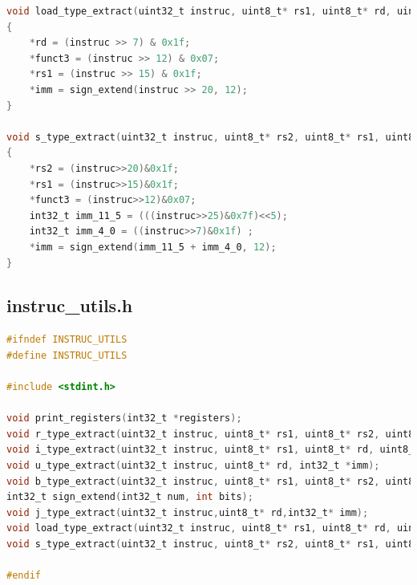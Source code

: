 \begin{lstlisting}[language=C]
void load_type_extract(uint32_t instruc, uint8_t* rs1, uint8_t* rd, uint8_t* funct3, int32_t* imm)
{
    *rd = (instruc >> 7) & 0x1f;
    *funct3 = (instruc >> 12) & 0x07;
    *rs1 = (instruc >> 15) & 0x1f;
    *imm = sign_extend(instruc >> 20, 12);
}

void s_type_extract(uint32_t instruc, uint8_t* rs2, uint8_t* rs1, uint8_t* funct3, int32_t* imm)
{
    *rs2 = (instruc>>20)&0x1f;
    *rs1 = (instruc>>15)&0x1f;
    *funct3 = (instruc>>12)&0x07;
    int32_t imm_11_5 = (((instruc>>25)&0x7f)<<5);
    int32_t imm_4_0 = ((instruc>>7)&0x1f) ;
    *imm = sign_extend(imm_11_5 + imm_4_0, 12);
}

\end{lstlisting}
\subsection{instruc\_utils.h}
\begin{lstlisting}[language=C]
#ifndef INSTRUC_UTILS
#define INSTRUC_UTILS

#include <stdint.h>

void print_registers(int32_t *registers);
void r_type_extract(uint32_t instruc, uint8_t* rs1, uint8_t* rs2, uint8_t* rd, uint8_t* funct7, uint8_t* funct3);
void i_type_extract(uint32_t instruc, uint8_t* rs1, uint8_t* rd, uint8_t* funct3, int32_t *imm);
void u_type_extract(uint32_t instruc, uint8_t* rd, int32_t *imm);
void b_type_extract(uint32_t instruc, uint8_t* rs1, uint8_t* rs2, uint8_t* funct3, int32_t*imm);
int32_t sign_extend(int32_t num, int bits);
void j_type_extract(uint32_t instruc,uint8_t* rd,int32_t* imm);
void load_type_extract(uint32_t instruc, uint8_t* rs1, uint8_t* rd, uint8_t* funct3, int32_t *imm);
void s_type_extract(uint32_t instruc, uint8_t* rs2, uint8_t* rs1, uint8_t* funct3, int32_t* imm);

#endif

\end{lstlisting}

